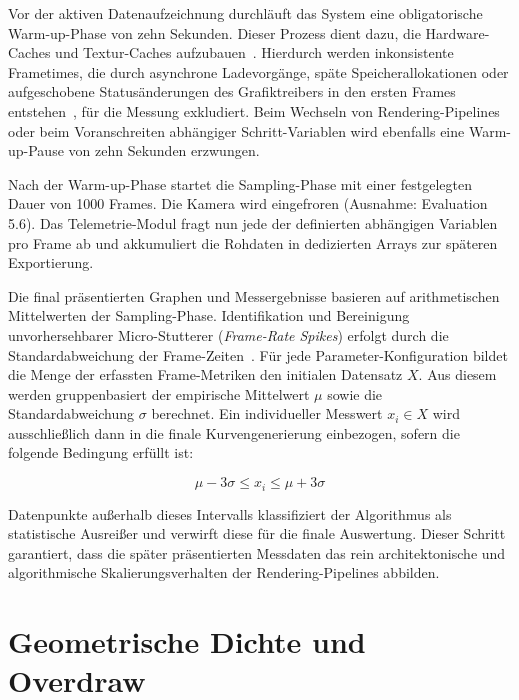 Vor der aktiven Datenaufzeichnung durchläuft das System eine obligatorische Warm-up-Phase von zehn Sekunden.
Dieser Prozess dient dazu, die Hardware-Caches und Textur-Caches
aufzubauen~\cites[Kap.~18.4, Abschn.~\textit{Memory Issues}]{akenine-mollerRealtimeRendering2019}[]{NVIDIATuringArchitectureWhitepaper}.
Hierdurch werden inkonsistente Frametimes, die durch asynchrone Ladevorgänge, späte Speicherallokationen oder
aufgeschobene Statusänderungen des Grafiktreibers in den ersten Frames
entstehen~\cite[Kap.~18.4.2, Abschn.~\textit{State Changes}]{akenine-mollerRealtimeRendering2019},
für die Messung exkludiert.
Beim Wechseln von Rendering-Pipelines oder beim Voranschreiten abhängiger Schritt-Variablen wird ebenfalls eine
Warm-up-Pause von zehn Sekunden erzwungen.


Nach der Warm-up-Phase startet die Sampling-Phase mit einer festgelegten Dauer von 1000 Frames.
Die Kamera wird eingefroren (Ausnahme: Evaluation 5.6).
Das Telemetrie-Modul fragt nun jede der definierten abhängigen Variablen pro Frame ab und akkumuliert die Rohdaten in
dedizierten Arrays zur späteren Exportierung.

Die final präsentierten Graphen und Messergebnisse basieren auf arithmetischen Mittelwerten der Sampling-Phase.
Identifikation und Bereinigung unvorhersehbarer Micro-Stutterer (\textit{Frame-Rate Spikes}) erfolgt durch die
Standardabweichung der Frame-Zeiten~\cite[Abschn.~8.5.2.2]{gregoryGameEngineArchitecture2018}.
Für jede Parameter-Konfiguration bildet die Menge der erfassten Frame-Metriken den initialen Datensatz $X$.
Aus diesem werden gruppenbasiert der empirische Mittelwert $\mu$ sowie die Standardabweichung $\sigma$ berechnet.
Ein individueller Messwert $x_i \in X$ wird ausschließlich dann in die finale Kurvengenerierung einbezogen, sofern die
folgende Bedingung erfüllt ist:

\begin{equation}
    \mu - 3\sigma \le x_i \le \mu + 3\sigma
\end{equation}

Datenpunkte außerhalb dieses Intervalls klassifiziert der Algorithmus als statistische Ausreißer und verwirft diese für
die finale Auswertung.
Dieser Schritt garantiert, dass die später präsentierten Messdaten das rein architektonische und algorithmische
Skalierungsverhalten der Rendering-Pipelines abbilden.


\section{{Geometrische Dichte und Overdraw}}
\label{sec:0502_geometry_eval}

